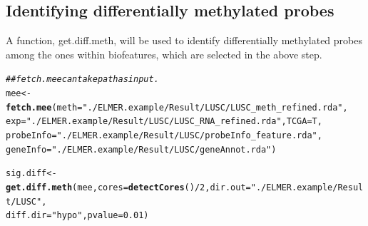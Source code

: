 \documentclass{article}\usepackage[]{graphicx}\usepackage[usenames,dvipsnames]{color}
\makeatletter
\newcommand{\hlnum}[1]{\textcolor[rgb]{0.686,0.059,0.569}{#1}}%
\newcommand{\hlstr}[1]{\textcolor[rgb]{0.192,0.494,0.8}{#1}}%
\newcommand{\hlcom}[1]{\textcolor[rgb]{0.678,0.584,0.686}{\textit{#1}}}%
\newcommand{\hlopt}[1]{\textcolor[rgb]{0,0,0}{#1}}%
\newcommand{\hlstd}[1]{\textcolor[rgb]{0.345,0.345,0.345}{#1}}%
\newcommand{\hlkwb}[1]{\textcolor[rgb]{0.69,0.353,0.396}{#1}}%
\newcommand{\hlkwc}[1]{\textcolor[rgb]{0.333,0.667,0.333}{#1}}%
\newcommand{\hlkwd}[1]{\textcolor[rgb]{0.737,0.353,0.396}{\textbf{#1}}}%
\newenvironment{kframe}{%
 \def\at@end@of@kframe{}%
 \ifinner\ifhmode%
  \def\at@end@of@kframe{\end{minipage}}%
  \begin{minipage}{\columnwidth}%
 \fi\fi%
 \def\FrameCommand##1{\hskip\@totalleftmargin \hskip-\fboxsep
 \colorbox{shadecolor}{##1}\hskip-\fboxsep
     \hskip-\linewidth \hskip-\@totalleftmargin \hskip\columnwidth}%
 \MakeFramed {\advance\hsize-\width
   \@totalleftmargin\z@ \linewidth\hsize
   \@setminipage}}%
 {\par\unskip\endMakeFramed%
 \at@end@of@kframe}
\newenvironment{knitrout}{}{} %
\makeatother
\begin{document}
\subsection{Identifying differentially methylated probes}
A function, get.diff.meth, will be used to identify differentially methylated 
probes among the ones within biofeatures, which are selected in the above step. 
\begin{knitrout}
\color{fgcolor}\begin{kframe}
\begin{alltt}
\hlcom{## fetch.mee can take path as input.}
\hlstd{mee} \hlkwb{<-} \hlkwd{fetch.mee}\hlstd{(}\hlkwc{meth}\hlstd{=}\hlstr{"./ELMER.example/Result/LUSC/LUSC_meth_refined.rda"}\hlstd{,}
                 \hlkwc{exp}\hlstd{=}\hlstr{"./ELMER.example/Result/LUSC/LUSC_RNA_refined.rda"}\hlstd{,} \hlkwc{TCGA}\hlstd{=T,}
                 \hlkwc{probeInfo}\hlstd{=}\hlstr{"./ELMER.example/Result/LUSC/probeInfo_feature.rda"}\hlstd{,}
                 \hlkwc{geneInfo}\hlstd{=}\hlstr{"./ELMER.example/Result/LUSC/geneAnnot.rda"}\hlstd{)}
\end{alltt}


{\ttfamily\noindent\itshape{}}\begin{alltt}
\hlstd{sig.diff} \hlkwb{<-} \hlkwd{get.diff.meth}\hlstd{(mee,} \hlkwc{cores}\hlstd{=}\hlkwd{detectCores}\hlstd{()}\hlopt{/}\hlnum{2}\hlstd{,} \hlkwc{dir.out} \hlstd{=}\hlstr{"./ELMER.example/Result/LUSC"}\hlstd{,}
                          \hlkwc{diff.dir}\hlstd{=}\hlstr{"hypo"}\hlstd{,} \hlkwc{pvalue} \hlstd{=} \hlnum{0.01}\hlstd{)}


\end{alltt}
\end{kframe}
\end{knitrout}
\end{document}
